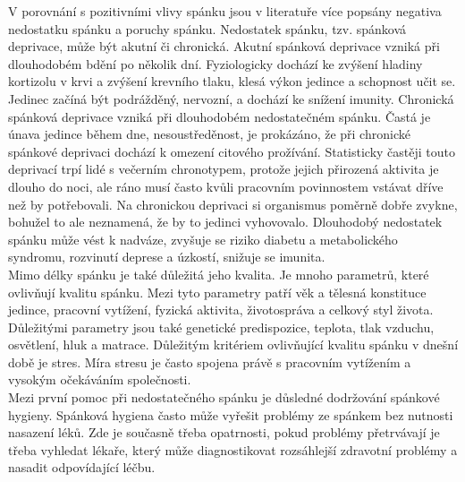 \documentclass[a4paper]{scrartcl}
\begin{document}
V porovnání s pozitivními vlivy spánku jsou v literatuře více
popsány negativa nedostatku spánku a poruchy
spánku. Nedostatek spánku, tzv. spánková deprivace, může být akutní 
či chronická. Akutní spánková deprivace vzniká při dlouhodobém bdění po několik dní. Fyziologicky dochází ke zvýšení hladiny kortizolu v krvi a zvýšení krevního tlaku, klesá výkon jedince a schopnost učit
se. Jedinec začíná být podrážděný, nervozní, a dochází ke snížení
imunity. Chronická spánková deprivace vzniká při dlouhodobém nedostatečném
spánku. Častá je únava jedince během dne, nesoustředěnost, je
prokázáno, že při chronické spánkové deprivaci dochází k omezení 
citového prožívání. Statisticky častěji touto deprivací trpí lidé
s večerním chronotypem, protože jejich přirozená aktivita je dlouho
do noci, ale ráno musí často kvůli pracovním povinnostem vstávat 
dříve než by potřebovali. \cite{Hostalkova_spanek_odpocatost} Na chronickou deprivaci si organismus poměrně dobře zvykne, bohužel to
ale neznamená, že by to jedinci vyhovovalo. Dlouhodobý nedostatek
spánku může vést k nadváze, zvyšuje se riziko diabetu a metabolického syndromu, rozvinutí deprese a úzkostí, 
snižuje se imunita. \cite{nhs_lack_of_sleep}\\

Mimo délky spánku je také důležitá jeho kvalita. Je mnoho parametrů,
které ovlivňují kvalitu spánku. Mezi tyto parametry patří věk a
tělesná konstituce jedince, pracovní vytížení, fyzická aktivita,
životospráva a celkový styl života. Důležitými parametry jsou také
genetické predispozice, teplota, tlak vzduchu, osvětlení, hluk
a matrace. \cite{Barosova_fyziologie_spanku} Důležitým kritériem 
ovlivňující kvalitu spánku v dnešní době je stres. Míra stresu je 
často spojena právě s pracovním vytížením a vysokým očekáváním 
společnosti. \\

Mezi první pomoc při nedostatečného
spánku je důsledné dodržování spánkové hygieny. Spánková hygiena často
může vyřešit problémy ze spánkem bez nutnosti nasazení léků. Zde je
současně třeba opatrnosti, pokud problémy přetrvávají je třeba vyhledat lékaře, který může diagnostikovat rozsáhlejší zdravotní 
problémy a nasadit odpovídající léčbu.\\
\end{document}

